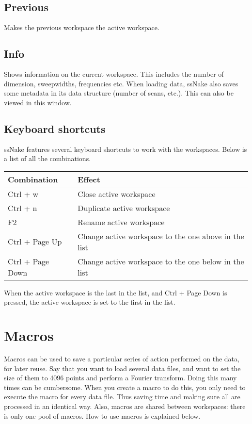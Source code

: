 \documentclass[11pt,a4paper]{article}
\begin{document}
\subsection{Previous}
Makes the previous workspace the active workspace.

\subsection{Info}
Shows information on the current workspace. This includes the number of dimension, sweepwidths,
frequencies etc. When loading data, ssNake also saves some metadata in its data structure (number of
scans, etc.).
This can also be viewed in this window.


\subsection{Keyboard shortcuts}
ssNake features several keyboard shortcuts to work with the workspaces. Below is a list of all the combinations.
\begin{center}
\begin{tabular}{ll}
\toprule
Combination & Effect \\
\midrule
\rowcolor{gray!30!white}
Ctrl + w & Close active workspace\\
Ctrl + n & Duplicate active workspace\\
\rowcolor{gray!30!white}
F2 & Rename active workspace\\
Ctrl + Page Up & Change active workspace to the one above in the list\\
\rowcolor{gray!30!white}
Ctrl + Page Down & Change active workspace to the one below in the list\\
\bottomrule
\end{tabular}
\end{center}
When the active workspace is the last in the list, and Ctrl + Page Down is pressed, the active workspace is set to the first in the list.

\section{Macros}
Macros can be used to save a particular series of action performed on the data, for later reuse. Say that you want to load several data files, and want to set the size of them to 4096 points and perform a Fourier transform. Doing this many times can be cumbersome. When you create a macro to do this, you only need to execute the macro for every data file. Thus saving time and making sure all are processed in an identical way. Also, macros are shared between workspaces: there is only one pool of macros. How to use macros is explained below.
\end{document}
